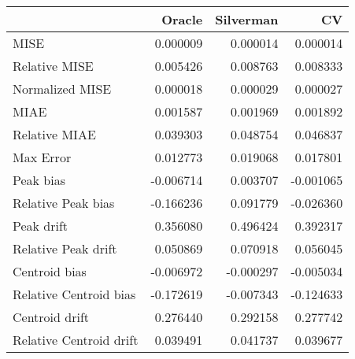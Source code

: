 \begin{tabular}{lrrr}
  \hline
 & Oracle & Silverman & CV \\ 
  \hline
MISE & 0.000009 & 0.000014 & 0.000014 \\ 
  Relative MISE & 0.005426 & 0.008763 & 0.008333 \\ 
  Normalized MISE & 0.000018 & 0.000029 & 0.000027 \\ 
  MIAE & 0.001587 & 0.001969 & 0.001892 \\ 
  Relative MIAE & 0.039303 & 0.048754 & 0.046837 \\ 
  Max Error & 0.012773 & 0.019068 & 0.017801 \\ 
  Peak bias & -0.006714 & 0.003707 & -0.001065 \\ 
  Relative Peak bias & -0.166236 & 0.091779 & -0.026360 \\ 
  Peak drift & 0.356080 & 0.496424 & 0.392317 \\ 
  Relative Peak drift & 0.050869 & 0.070918 & 0.056045 \\ 
  Centroid bias & -0.006972 & -0.000297 & -0.005034 \\ 
  Relative Centroid bias & -0.172619 & -0.007343 & -0.124633 \\ 
  Centroid drift & 0.276440 & 0.292158 & 0.277742 \\ 
  Relative Centroid drift & 0.039491 & 0.041737 & 0.039677 \\ 
   \hline
\end{tabular}

